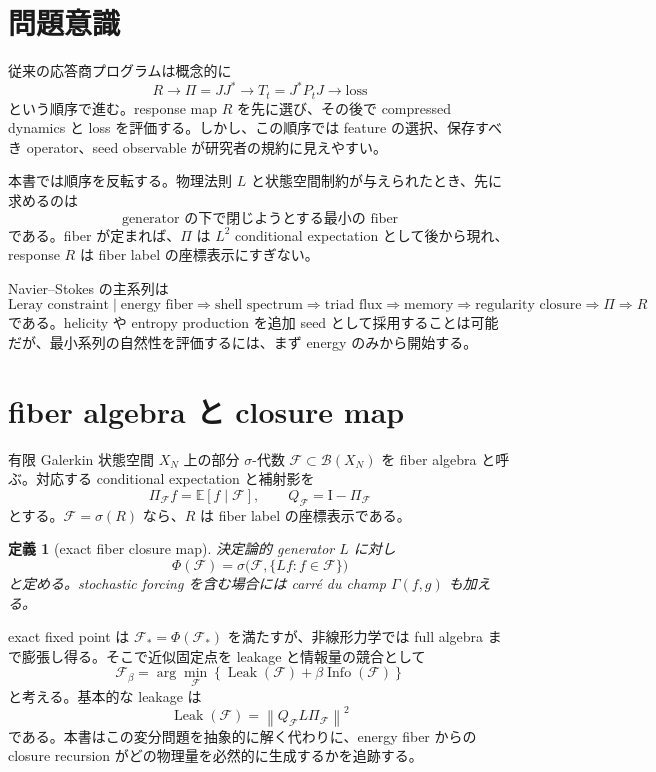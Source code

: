 \documentclass[11pt,a4paper,openany]{book}
\newtheorem{definition}{定義}[chapter]
\numberwithin{equation}{chapter}
\newcommand{\E}{\mathbb E}
\newcommand{\cF}{\mathcal F}
\newcommand{\Id}{\mathrm I}
\newcommand{\norm}[1]{\left\lVert #1\right\rVert}
\begin{document}
\section{問題意識}
従来の応答商プログラムは概念的に
\[
R\longrightarrow \Pi=JJ^*\longrightarrow T_t=J^*P_tJ\longrightarrow\text{loss}
\]
という順序で進む。response map $R$ を先に選び、その後で compressed dynamics と loss を評価する。しかし、この順序では feature の選択、保存すべき operator、seed observable が研究者の規約に見えやすい。

本書では順序を反転する。物理法則 $L$ と状態空間制約が与えられたとき、先に求めるのは
\[
\boxed{\text{generator の下で閉じようとする最小の fiber}}
\]
である。fiber が定まれば、$\Pi$ は $L^2$ conditional expectation として後から現れ、response $R$ は fiber label の座標表示にすぎない。

Navier--Stokes の主系列は
\[
\text{Leray constraint}\mid\text{energy fiber}
\Rightarrow\text{shell spectrum}
\Rightarrow\text{triad flux}
\Rightarrow\text{memory}
\Rightarrow\text{regularity closure}
\Rightarrow\Pi\Rightarrow R
\]
である。helicity や entropy production を追加 seed として採用することは可能だが、最小系列の自然性を評価するには、まず energy のみから開始する。

\section{fiber algebra と closure map}
有限 Galerkin 状態空間 $X_N$ 上の部分 $\sigma$-代数 $\cF\subset\mathcal B(X_N)$ を fiber algebra と呼ぶ。対応する conditional expectation と補射影を
\[
\Pi_{\cF}f=\E[f\mid\cF],
\qquad
Q_{\cF}=\Id-\Pi_{\cF}
\]
とする。$\cF=\sigma(R)$ なら、$R$ は fiber label の座標表示である。

\begin{definition}[exact fiber closure map]
決定論的 generator $L$ に対し
\[
\Phi(\cF)=\sigma\bigl(\cF,\{Lf:f\in\cF\}\bigr)
\]
と定める。stochastic forcing を含む場合には carré du champ $\Gamma(f,g)$ も加える。
\end{definition}

exact fixed point は $\cF_* = \Phi(\cF_*)$ を満たすが、非線形力学では full algebra まで膨張し得る。そこで近似固定点を leakage と情報量の競合として
\[
\cF_\beta
=\arg\min_{\cF}
\left\{
\operatorname{Leak}(\cF)+\beta\operatorname{Info}(\cF)
\right\}
\]
と考える。基本的な leakage は
\[
\operatorname{Leak}(\cF)
=\norm{Q_{\cF}L\Pi_{\cF}}^2
\]
である。本書はこの変分問題を抽象的に解く代わりに、energy fiber からの closure recursion がどの物理量を必然的に生成するかを追跡する。
\end{document}
